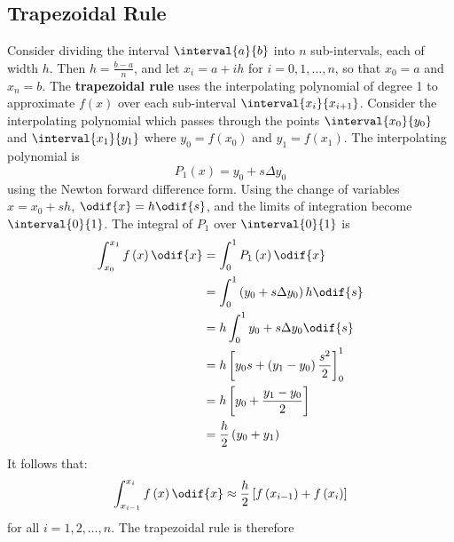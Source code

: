 \documentclass{article}
\begin{document}
\subsection{Trapezoidal Rule}
Consider dividing the interval \(\interval{a}{b}\) into \(n\)
sub-intervals, each of width \(h\). Then \(h = \frac{b - a}{n}\), and
let \(x_i = a + ih\) for \(i = 0, 1, \ldots, n\), so that \(x_0 = a\)
and \(x_n = b\). The \textbf{trapezoidal rule} uses the interpolating
polynomial of degree 1 to approximate \(f\left( x \right)\) over each
sub-interval \(\interval{x_i}{x_{i + 1}}\). Consider the interpolating
polynomial which passes through the points \(\interval{x_0}{y_0}\) and
\(\interval{x_1}{y_1}\) where \(y_0 = f\left( x_0 \right)\) and \(y_1 =
f\left( x_1 \right)\). The interpolating polynomial is
\begin{equation*}
    P_1\left( x \right) = y_0 + s \Delta{y_0}
\end{equation*}
using the Newton forward difference form. Using the change of variables
\(x = x_0 + s h\), \(\odif{x} = h \odif{s}\), and the limits of
integration become \(\interval{0}{1}\). The integral of \(P_1\) over
\(\interval{0}{1}\) is
\begin{align*}
    \int_{x_0}^{x_1} f\left( x \right) \odif{x} & = \int_0^1 P_1\left( x \right) \odif{x}                               \\
                                                & = \int_0^1 \left( y_0 + s \Delta{y_0} \right) h \odif{s}              \\
                                                & = h \int_0^1 y_0 + s \Delta{y_0} \odif{s}                             \\
                                                & = h \left[ y_0 s + \left( y_1 - y_0 \right) \frac{s^2}{2} \right]_0^1 \\
                                                & = h \left[ y_0 + \frac{y_1 - y_0}{2} \right]                          \\
                                                & = \frac{h}{2} \left( y_0 + y_1 \right)
\end{align*}
It follows that:
\begin{equation*}
    \int_{x_{i - 1}}^{x_i} f\left( x \right) \odif{x} \approx \frac{h}{2} \left[ f\left( x_{i - 1} \right) + f\left( x_i \right) \right]
\end{equation*}
for all \(i = 1, 2, \ldots, n\). The trapezoidal rule is therefore
\end{document}
